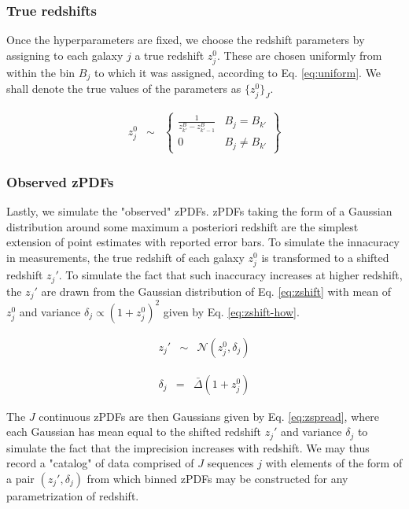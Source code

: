 \documentclass[preprint]{aastex}
\begin{document}
\subsubsection{True redshifts}
\label{sec:z}

Once the hyperparameters are fixed, we choose the redshift parameters by assigning to each galaxy $j$ a true redshift $z_{j}^{0}$.  These are chosen uniformly from within the bin $B_{j}$ to which it was assigned, according to Eq. \ref{eq:uniform}.  We shall denote the true values of the parameters as $\{z_{j}^{0}\}_{J}$. 

\begin{eqnarray}
\label{eq:uniform}
z_{j}^{0} &\sim& \left\{\begin{array}{cc}\frac{1}{z^{B}_{k'}-z^{B}_{k'-1}} & B_{j} = B_{k'}\\0 & B_{j} \neq B_{k'}\end{array}\right\}
\end{eqnarray}

\clearpage
\subsubsection{Observed zPDFs}
\label{sec:d}

Lastly, we simulate the "observed" zPDFs.  zPDFs taking the form of a Gaussian distribution around some maximum a posteriori redshift are the simplest extension of point estimates with reported error bars.  To simulate the innacuracy in measurements, the true redshift of each galaxy $z_{j}^{0}$ is transformed to a shifted redshift $z_{j}'$.  To simulate the fact that such inaccuracy increases at higher redshift, the $z_{j}'$ are drawn from the Gaussian distribution of Eq. \ref{eq:zshift} with mean of $z_{j}^{0}$ and variance $\delta_{j}\propto(1+z_{j}^{0})^{2}$ given by Eq. \ref{eq:zshift-how}.  

\begin{eqnarray}
\label{eq:zshift}
z_{j}' &\sim& \mathcal{N}(z_{j}^{0},\delta_{j})
\end{eqnarray}

\begin{eqnarray}
\label{eq:zshift-how}
\delta_{j} &=& \bar{\Delta}(1+z^{0}_{j})
\end{eqnarray}

The $J$ continuous zPDFs are then Gaussians given by Eq. \ref{eq:zspread}, where each Gaussian has mean equal to the shifted redshift $z_{j}'$ and variance $\delta_{j}$ to simulate the fact that the imprecision increases with redshift.  We may thus record a "catalog" of data comprised of $J$ sequences $j$ with elements of the form of a pair $(z_{j}',\delta_{j})$ from which binned zPDFs may be constructed for any parametrization of redshift.  
\end{document}
